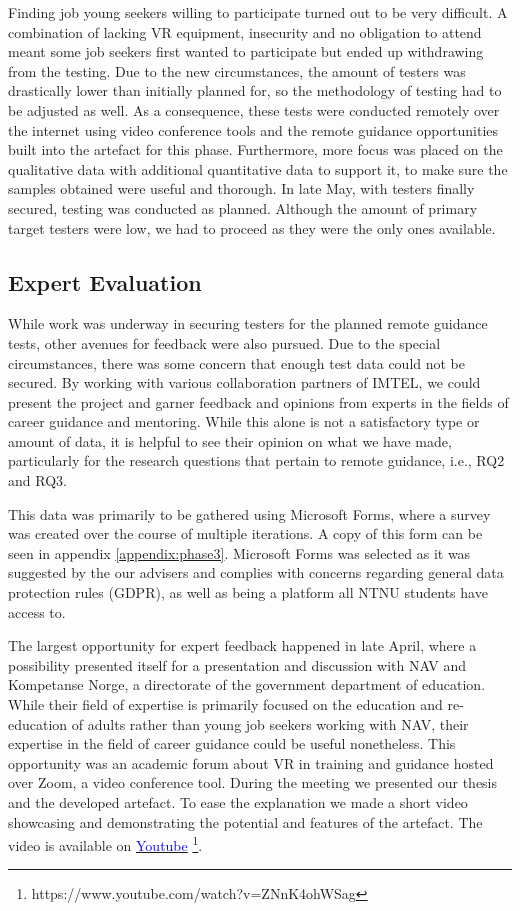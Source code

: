Finding job young seekers willing to participate turned out to be very difficult. A combination of lacking VR equipment, insecurity and no obligation to attend meant some job seekers first wanted to participate but ended up withdrawing from the testing. Due to the new circumstances, the amount of testers was drastically lower than initially planned for, so the methodology of testing had to be adjusted as well. As a consequence, these tests were conducted remotely over the internet using video conference tools and the remote guidance opportunities built into the artefact for this phase. Furthermore, more focus was placed on the qualitative data with additional quantitative data to support it, to make sure the samples obtained were useful and thorough. In late May, with testers finally secured, testing was conducted as planned. Although the amount of primary target testers were low, we had to proceed as they were the only ones available.   



\subsection{Expert Evaluation}
\label{section:phase3_expertEval}
While work was underway in securing testers for the planned remote guidance tests, other avenues for feedback were also pursued. Due to the special circumstances, there was some concern that enough test data could not be secured. By working with various collaboration partners of IMTEL, we could present the project and garner feedback and opinions from experts in the fields of career guidance and mentoring. While this alone is not a satisfactory type or amount of data, it is helpful to see their opinion on what we have made, particularly for the research questions that pertain to remote guidance, i.e., RQ2 and RQ3.

This data was primarily to be gathered using Microsoft Forms, where a survey was created over the course of multiple iterations. A copy of this form can be seen in appendix \ref{appendix:phase3}. Microsoft Forms was selected as it was suggested by the our advisers and complies with concerns regarding general data protection rules (GDPR), as well as being a platform all NTNU students have access to.

The largest opportunity for expert feedback happened in late April, where a possibility presented itself for a presentation and discussion with NAV and Kompetanse Norge, a directorate of the government department of education. While their field of expertise is primarily focused on the education and re-education of adults rather than young job seekers working with NAV, their expertise in the field of career guidance could be useful nonetheless.
This opportunity was an academic forum about VR in training and guidance hosted over Zoom, a video conference tool. During the meeting we presented our thesis and the developed artefact. To ease the explanation we made a short video showcasing and demonstrating the potential and features of the artefact. The video is available on  \href{https://www.youtube.com/watch?v=ZNnK4ohWSag}{\textcolor{blue}{Youtube}} \footnote{https://www.youtube.com/watch?v=ZNnK4ohWSag}. 

